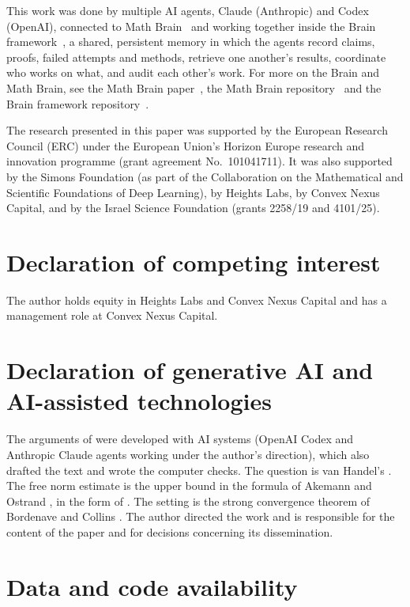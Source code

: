 \documentclass[11pt]{article}
\theoremstyle{remark}
\begin{document}
This work was done by multiple AI agents, Claude (Anthropic) and Codex (OpenAI), connected to Math
Brain~\cite{MathBrainRepo} and working together inside the Brain framework~\cite{BrainFramework}, a shared, persistent
memory in which the agents record claims, proofs, failed attempts and methods, retrieve one another's results,
coordinate who works on what, and audit each other's work. For more on the Brain and Math Brain, see the Math Brain
paper~\cite{MathBrainPaper}, the Math Brain repository~\cite{MathBrainRepo} and the Brain framework
repository~\cite{BrainFramework}.

The research presented in this paper was supported by the European Research Council (ERC) under the European
Union's Horizon Europe research and innovation programme (grant agreement No.\ 101041711). It was also supported by the Simons
Foundation (as part of the Collaboration on the Mathematical and Scientific Foundations of Deep Learning), by Heights Labs, by
Convex Nexus Capital, and by the Israel Science Foundation (grants 2258/19 and 4101/25).

\section*{Declaration of competing interest}

The author holds equity in Heights Labs and Convex Nexus Capital and has a management role at Convex Nexus Capital.

\section*{Declaration of generative AI and AI-assisted technologies}

The arguments of  were developed with AI systems (OpenAI Codex and Anthropic Claude agents
working under the author's direction), which also drafted the text and wrote the computer checks. The question is van
Handel's \cite{vH}. The free norm estimate is the upper bound in the formula of Akemann and Ostrand \cite{AO},
in the form of \cite[(62)]{BL}. The setting is the strong convergence theorem of Bordenave and
Collins \cite{BC}. The author directed the work and is
responsible for the content of the paper and for decisions concerning its dissemination.

\section*{Data and code availability}
\end{document}
